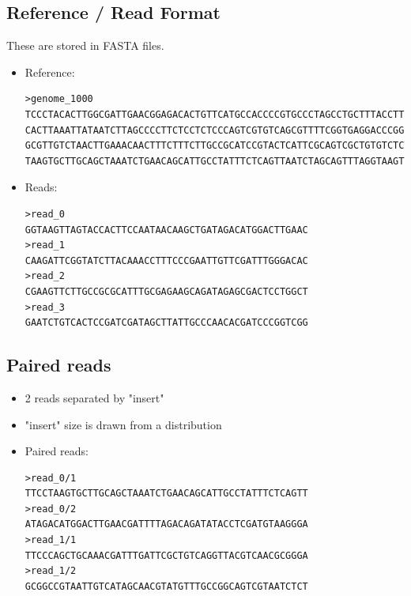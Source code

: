 \documentclass[10pt]{article}
\begin{document}
\subsection*{Reference / Read Format}
These are stored in FASTA files.
\begin{itemize}
    \item Reference:
    \begin{verbatim}
>genome_1000
TCCCTACACTTGGCGATTGAACGGAGACACTGTTCATGCCACCCCGTGCCCTAGCCTGCTTTACCTTGCTGGCGCCCCCT
CACTTAAATTATAATCTTAGCCCCTTCTCCTCTCCCAGTCGTGTCAGCGTTTTCGGTGAGGACCCGGGGTAAGTTCACGT
GCGTTGTCTAACTTGAAACAACTTTCTTTCTTGCCGCATCCGTACTCATTCGCAGTCGCTGTGTCTCTAACCCAACTTCC
TAAGTGCTTGCAGCTAAATCTGAACAGCATTGCCTATTTCTCAGTTAATCTAGCAGTTTAGGTAAGTTAGTACCACTTCC
    \end{verbatim}
    \item Reads:
    \begin{verbatim}
>read_0
GGTAAGTTAGTACCACTTCCAATAACAAGCTGATAGACATGGACTTGAAC
>read_1
CAAGATTCGGTATCTTACAAACCTTTCCCGAATTGTTCGATTTGGGACAC
>read_2
CGAAGTTCTTGCCGCGCATTTGCGAGAAGCAGATAGAGCGACTCCTGGCT
>read_3
GAATCTGTCACTCCGATCGATAGCTTATTGCCCAACACGATCCCGGTCGG
    \end{verbatim}
\end{itemize}
\subsection*{Paired reads}
\begin{itemize}
    \item 2 reads separated by "insert"
    \item "insert" size is drawn from a distribution
    \item Paired reads:
    \begin{verbatim}
>read_0/1
TTCCTAAGTGCTTGCAGCTAAATCTGAACAGCATTGCCTATTTCTCAGTT
>read_0/2
ATAGACATGGACTTGAACGATTTTAGACAGATATACCTCGATGTAAGGGA
>read_1/1
TTCCCAGCTGCAAACGATTTGATTCGCTGTCAGGTTACGTCAACGCGGGA
>read_1/2
GCGGCCGTAATTGTCATAGCAACGTATGTTTGCCGGCAGTCGTAATCTCT            
    \end{verbatim}
\end{itemize}
\end{document}
